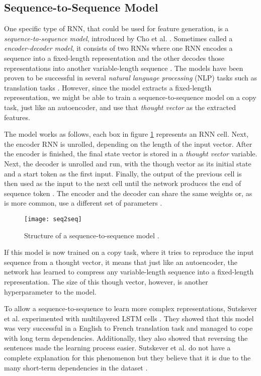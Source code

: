 \subsection{Sequence-to-Sequence Model} \label{sec:seq2seq}

One specific type of RNN, that could be used for feature generation, is a \textit{sequence-to-sequence model}, introduced by Cho et al. \cite{cho2014learning}.
Sometimes called a \textit{encoder-decoder model}, it consists of two RNNs where one RNN encodes a sequence into a fixed-length representation and the other decodes those representations into another variable-length sequence \cite{cho2014learning}.
The models have been proven to be successful in several \textit{natural language processing} (NLP) tasks such as translation tasks \cite{cho2014learning,sutskever_vinyals_le,tensorflowseq2seq}.
However, since the model extracts a fixed-length representation, we might be able to train a sequence-to-sequence model on a copy task, just like an autoencoder, and use that \textit{thought vector} as the extracted features.

The model works as follows, each box in figure \ref{fig:seq2seq} represents an RNN cell. Next, the encoder RNN is unrolled, depending on the length of the input vector.
After the encoder is finished, the final state vector is stored in a \textit{thought vector} variable.
Next, the decoder is unrolled and run, with the though vector as its initial state and a start token as the first input.
Finally, the output of the previous cell is then used as the input to the next cell until the network produces the end of sequence token \cite{cho2014learning}.
The encoder and the decoder can share the same weights or, as is more common, use a different set of parameters \cite{tensorflowseq2seq}.

\begin{figure}[ht]
  \centering
  \texttt{[image: seq2seq]}
  \caption{Structure of a sequence-to-sequence model \cite{britz_2016_1}.}
  \label{fig:seq2seq}
\end{figure}

If this model is now trained on a copy task, where it tries to reproduce the input sequence from a thought vector, it means that just like an autoencoder,
the network has learned to compress any variable-length sequence into a fixed-length representation.
The size of this though vector, however, is another hyperparameter to the model.

To allow a sequence-to-sequence to learn more complex representations, Sutskever et al. experimented with multilayered LSTM cells \cite{sutskever_vinyals_le}.
They showed that this model was very successful in a English to French translation task and managed to cope with long term dependencies.
Additionally, they also showed that reversing the sentences made the learning process easier.
Sutskever et al. do not have a complete explanation for this phenomenon but they believe that it is due to the many short-term dependencies in the dataset \cite{sutskever_vinyals_le}.

